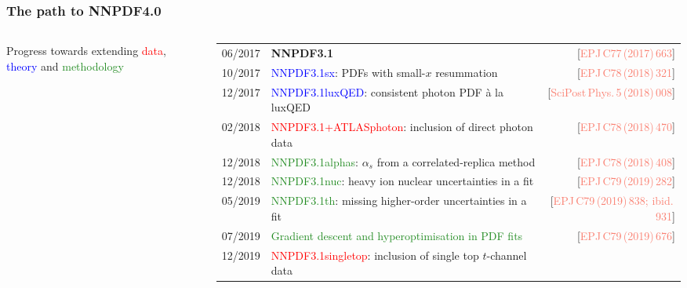 \documentclass[aspectratio=169,9pt]{beamer}
\begin{document}
\begin{frame}
 \frametitle{The path to NNPDF4.0}
 \begin{columns}
	 \footnotesize
	 \begin{block}{}
	  \centering
	  Progress towards extending {\textcolor{red}{data}}, {\textcolor{blue}{theory}} and {\textcolor{forestgreen}{methodology}}\\
	 \end{block}
	 \scriptsize
	 \renewcommand*{\arraystretch}{1.4}
	 \begin{tabularx}{\textwidth}{lXr}
	  06/2017 & {\bf NNPDF3.1}                                                              
	          & {\tiny{[{\textcolor{salmon}{EPJ\,C77\,(2017)\,663}}]}}\\
	  10/2017 & \textcolor{blue}{NNPDF3.1sx}: {\scriptsize PDFs with small-$x$ resummation}                                                
	          & {\tiny{[{\textcolor{salmon}{EPJ\,C78\,(2018)\,321}}]}}\\
	  12/2017 & \textcolor{blue}{NNPDF3.1luxQED}: {\scriptsize consistent photon PDF \`a la luxQED}                                            
	          & {\tiny{[{\textcolor{salmon}{SciPost\,Phys.\,5\,(2018)\,008}}]}}\\
	  02/2018 & \textcolor{red}{NNPDF3.1+ATLASphoton}: {\scriptsize inclusion of direct photon data}                                       
	          & {\tiny{[{\textcolor{salmon}{EPJ\,C78\,(2018)\,470}}]}}\\
	  12/2018 & \textcolor{forestgreen}{NNPDF3.1alphas}: {\scriptsize $\alpha_s$ from a correlated-replica method}                                     
	          & {\tiny{[{\textcolor{salmon}{EPJ\,C78\,(2018)\,408}}]}}\\
	  12/2018 & \textcolor{forestgreen}{NNPDF3.1nuc}: {\scriptsize heavy ion nuclear uncertainties in a fit}                                        
	          & {\tiny{[{\textcolor{salmon}{EPJ\,C79\,(2019)\,282}}]}}\\
	  05/2019 & \textcolor{forestgreen}{NNPDF3.1th}: {\scriptsize missing higher-order uncertainties in a fit}                                         
	          & {\tiny{[{\textcolor{salmon}{EPJ\,C79\,(2019)\,838; ibid.\,931}}]}}\\
	  07/2019 & \textcolor{forestgreen}{Gradient descent and hyperoptimisation in PDF fits} 
	          & {\tiny{[{\textcolor{salmon}{EPJ\,C79\,(2019)\,676}}]}}\\
	  12/2019 & \textcolor{red}{NNPDF3.1singletop}: {\scriptsize inclusion of single top $t$-channel data}                                          

\end{tabularx}
\end{columns}
\end{frame}
\end{document}
